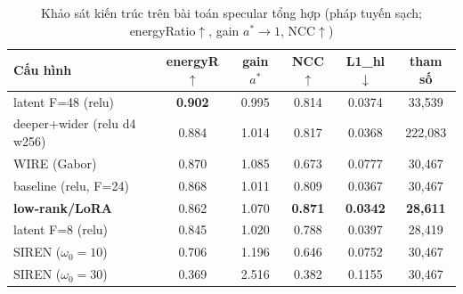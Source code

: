     \begin{table}[h]
    \centering
    \caption{Khảo sát kiến trúc trên bài toán specular tổng hợp (pháp tuyến sạch;
    energyRatio$\uparrow$, gain $a^*\!\to\!1$, NCC$\uparrow$)}
    \label{tab:sf_ablation}
    \vspace{0.2cm}
    \begin{tabular}{@{}lccccc@{}}
    \toprule
    \textbf{Cấu hình} & \textbf{energyR}$\uparrow$ & \textbf{gain }$a^*$ &
    \textbf{NCC}$\uparrow$ & \textbf{L1\_hl}$\downarrow$ & \textbf{tham số} \\ \midrule
    latent F=48 (relu)              & \textbf{0.902} & 0.995 & 0.814 & 0.0374 & 33{,}539 \\
    deeper+wider (relu d4 w256)     & 0.884 & 1.014 & 0.817 & 0.0368 & 222{,}083 \\
    WIRE (Gabor) \cite{wire}        & 0.870 & 1.085 & 0.673 & 0.0777 & 30{,}467 \\
    baseline (relu, F=24)           & 0.868 & 1.011 & 0.809 & 0.0367 & 30{,}467 \\
    \textbf{low-rank/LoRA} \cite{lora} & 0.862 & 1.070 & \textbf{0.871} & \textbf{0.0342} & \textbf{28{,}611} \\
    latent F=8 (relu)               & 0.845 & 1.020 & 0.788 & 0.0397 & 28{,}419 \\
    SIREN ($\omega_0\!=\!10$) \cite{siren} & 0.706 & 1.196 & 0.646 & 0.0752 & 30{,}467 \\
    SIREN ($\omega_0\!=\!30$) \cite{siren} & 0.369 & 2.516 & 0.382 & 0.1155 & 30{,}467 \\
    \bottomrule
    \end{tabular}
    \end{table}

